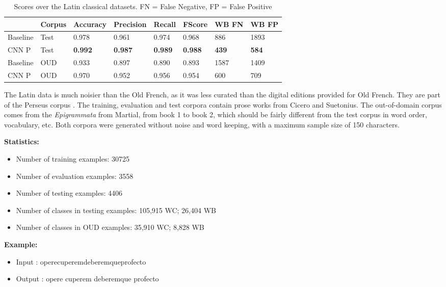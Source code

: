 \documentclass{jdmdh}
\begin{document}
\begin{table}[H]
\centering
\begin{tabular}{llllllll}
\hline
 & Corpus & Accuracy & Precision & Recall & FScore & WB FN & WB FP \\ \hline
Baseline & Test & 0.978 & 0.961 & 0.974 & 0.968 & 886 & 1893 \\
CNN P & Test & \textbf{0.992} & \textbf{0.987} & \textbf{0.989} & \textbf{0.988} & \textbf{439} & \textbf{584} \\ \hline
Baseline & OUD & 0.933 & 0.897 & 0.890 & 0.893 & 1587 & 1409 \\
CNN P & OUD & 0.970 & 0.952 & 0.956 & 0.954 & 600 & 709 \\ \hline
\end{tabular}
\caption{Scores over the Latin classical datasets. FN = False Negative, FP = False Positive}
\label{tab:latin_corpora}
\end{table}

The Latin data is much noisier than the Old French, as it was less curated than the digital editions provided for Old French. They are part of the Perseus corpus \citet{perseus}. The training, evaluation and test corpora contain prose works from Cicero and Suetonius. The out-of-domain corpus comes from the \textit{Epigrammata} from Martial, from book 1 to book 2, which should be fairly different from the test corpus in word order, vocabulary, etc. Both corpora were generated without noise and word keeping, with a maximum sample size of 150 characters.

\textbf{Statistics:}
\begin{itemize}
\item Number of training examples: 30725
\item Number of evaluation examples: 3558
\item Number of testing examples: 4406
\item Number of classes in testing examples: 105,915 WC; 26,404 WB
\item Number of classes in OUD examples: 35,910 WC; 8,828 WB
\end{itemize}

\textbf{Example:}

\begin{itemize}
    \item Input : operecuperemdeberemqueprofecto
    \item Output : opere cuperem deberemque profecto

\end{itemize}
\end{document}
